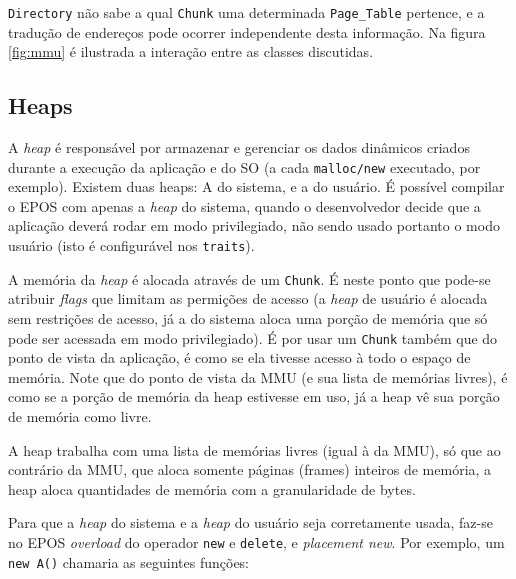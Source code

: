 

\verb+Directory+ não sabe a qual \verb+Chunk+ uma determinada \verb+Page_Table+ pertence, e a tradução de endereços pode ocorrer independente desta informação. Na figura \ref{fig:mmu} é ilustrada a interação entre as classes discutidas.




\subsection{Heaps}

A \emph{heap} é responsável por armazenar e gerenciar os dados dinâmicos criados durante a execução da aplicação e do SO (a cada \verb+malloc/new+ executado, por exemplo). Existem duas heaps: A do sistema, e a do usuário. É possível compilar o EPOS com apenas a \emph{heap} do sistema, quando o desenvolvedor decide que a aplicação deverá rodar em modo privilegiado, não sendo usado portanto o modo usuário (isto é configurável nos \verb+traits+).

A memória da \emph{heap} é alocada através de um \verb+Chunk+. É neste ponto que pode-se atribuir \emph{flags} que limitam as permições de acesso (a \emph{heap} de usuário é alocada sem restrições de acesso, já a do sistema aloca uma porção de memória que só pode ser acessada em modo privilegiado). É por usar um \verb+Chunk+ também que do ponto de vista da aplicação, é como se ela tivesse acesso à todo o espaço de memória. Note que do ponto de vista da MMU (e sua lista de memórias livres), é como se a porção de memória da heap estivesse em uso, já a heap vê sua porção de memória como livre.

A heap trabalha com uma lista de memórias livres (igual à da MMU), só que ao contrário da MMU, que aloca somente páginas (frames) inteiros de memória, a heap aloca quantidades de memória com a granularidade de bytes.

Para que a \emph{heap} do sistema e a \emph{heap} do usuário seja corretamente usada, faz-se no EPOS \emph{overload} do operador \verb+new+ e \verb+delete+, e \emph{placement new}. Por exemplo, um \verb+new A()+ chamaria as seguintes funções:

